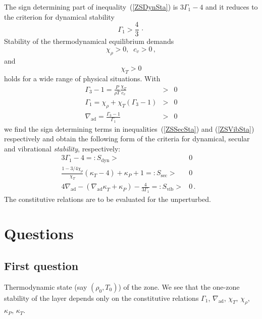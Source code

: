 \documentclass{layout}
\begin{document}
   The sign determining part of inequality~(\ref{ZSDynSta}) is
   $3\Gamma_1 - 4$ and it reduces to the
   criterion for dynamical stability
   \begin{equation}
     \Gamma_1 > \frac{4}{3}\,\cdot
   \end{equation}
   Stability of the thermodynamical equilibrium demands
   \begin{equation}
      \chi^{}_\rho > 0, \;\;  c_v > 0\, ,
   \end{equation}
   and
   \begin{equation}
      \chi^{}_T > 0
   \end{equation}
   holds for a wide range of physical situations.
   With
   \begin{eqnarray}
      \Gamma_3 - 1 = \frac{P}{\rho T} \frac{\chi^{}_T}{c_v}&>&0\\
      \Gamma_1     = \chi_\rho^{} + \chi_T^{} (\Gamma_3 -1)&>&0\\
      \nabla_{\mathrm{ad}}  = \frac{\Gamma_3 - 1}{\Gamma_1}         &>&0
   \end{eqnarray}
   we find the sign determining terms in inequalities~(\ref{ZSSecSta})
   and (\ref{ZSVibSta}) respectively and obtain the following form
   of the criteria for dynamical, secular and vibrational
   \emph{stability}, respectively:
   \begin{eqnarray}
      3 \Gamma_1 - 4 =: S_{\mathrm{dyn}}      > & 0 & \label{DynSta}  \\
%
      \frac{ 1- 3/4 \chi^{}_\rho }{ \chi^{}_T } ( \kappa^{}_T - 4 )
         + \kappa^{}_P + 1 =: S_{\mathrm{sec}} > & 0 & \label{SecSta} \\
%
      4 \nabla_{\mathrm{ad}} - (\nabla_{\mathrm{ad}} \kappa^{}_T
                             + \kappa^{}_P)
                             - \frac{4}{3 \Gamma_1} =: S_{\mathrm{vib}}
                                      > & 0\,.& \label{VibSta}
   \end{eqnarray}
   The constitutive relations are to be evaluated for the
   unperturbed.

\section{Questions}

\subsection{First question}
   Thermodynamic state (say $(\rho_0, T_0)$) of the zone.
   We see that the one-zone stability of the layer depends only on
   the constitutive relations $\Gamma_1$,
   $\nabla_{\mathrm{ad}}$, $\chi_T^{},\,\chi_\rho^{}$,
   $\kappa_P^{},\,\kappa_T^{}$.
\end{document}
